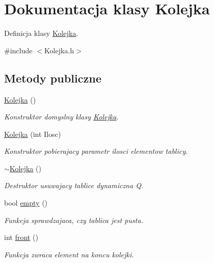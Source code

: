 \hypertarget{class_kolejka}{\section{Dokumentacja klasy Kolejka}
\label{class_kolejka}
}


Definicja klasy \hyperlink{class_kolejka}{Kolejka}.  




{\ttfamily \#include $<$Kolejka.\-h$>$}

\subsection*{Metody publiczne}
\begin{DoxyCompactItemize}
\item 
\hyperlink{class_kolejka_a37c886fdc73dce62b04da0381dec5484}{Kolejka} ()
\begin{DoxyCompactList}\small\item\em Konstruktor domyslny klasy \hyperlink{class_kolejka}{Kolejka}. \end{DoxyCompactList}\item 
\hyperlink{class_kolejka_a507889c5f122d922544fdaf4dd58b2d0}{Kolejka} (int Ilosc)
\begin{DoxyCompactList}\small\item\em Konstruktor pobierajacy parametr ilosci elementow tablicy. \end{DoxyCompactList}\item 
\hyperlink{class_kolejka_a352f86ff08cd47be6c35c60bb0f873a6}{$\sim$\-Kolejka} ()
\begin{DoxyCompactList}\small\item\em Destruktor usuwajacy tablice dynamiczna Q. \end{DoxyCompactList}\item 
bool \hyperlink{class_kolejka_afdd931c17c1fa4d93bc5c8aa45cb212a}{empty} ()
\begin{DoxyCompactList}\small\item\em Funkcja sprawdzajaca, czy tablica jest pusta. \end{DoxyCompactList}\item 
int \hyperlink{class_kolejka_a6476787f1d02eb82e334f1be10daea66}{front} ()
\begin{DoxyCompactList}\small\item\em Funkcja zwraca element na koncu kolejki. \end{DoxyCompactList}\item 

\end{DoxyCompactItemize}
